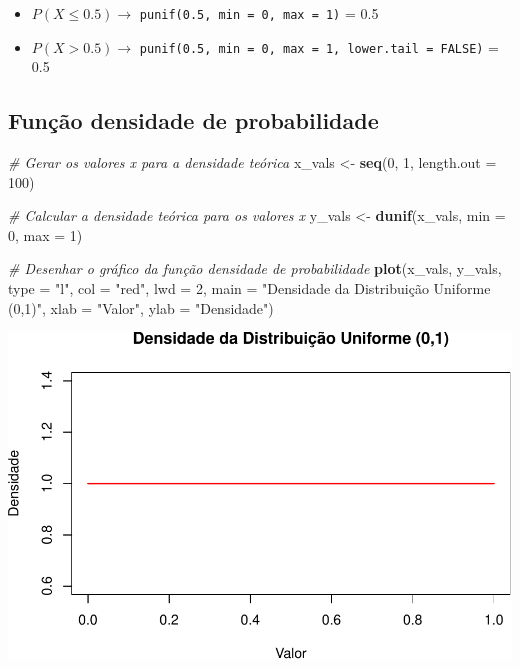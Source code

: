 \documentclass[
]{book}
\newenvironment{Shaded}{\begin{snugshade}}{\end{snugshade}}
\newcommand{\AttributeTok}[1]{\textcolor[rgb]{0.13,0.29,0.53}{#1}}
\newcommand{\CommentTok}[1]{\textcolor[rgb]{0.56,0.35,0.01}{\textit{#1}}}
\newcommand{\DecValTok}[1]{\textcolor[rgb]{0.00,0.00,0.81}{#1}}
\newcommand{\FunctionTok}[1]{\textcolor[rgb]{0.13,0.29,0.53}{\textbf{#1}}}
\newcommand{\NormalTok}[1]{#1}
\newcommand{\OtherTok}[1]{\textcolor[rgb]{0.56,0.35,0.01}{#1}}
\newcommand{\StringTok}[1]{\textcolor[rgb]{0.31,0.60,0.02}{#1}}
\begin{document}
\begin{itemize}
\item
  \(P(X\leq 0.5) \to\) \texttt{punif(0.5,\ min\ =\ 0,\ max\ =\ 1)} = 0.5
\item
  \(P(X > 0.5) \to\) \texttt{punif(0.5,\ min\ =\ 0,\ max\ =\ 1,\ lower.tail\ =\ FALSE)} = 0.5
\end{itemize}

\subsection{Função densidade de probabilidade}\label{funuxe7uxe3o-densidade-de-probabilidade}

\begin{Shaded}
\begin{Highlighting}[]
\CommentTok{\# Gerar os valores x para a densidade teórica}
\NormalTok{x\_vals }\OtherTok{\textless{}{-}} \FunctionTok{seq}\NormalTok{(}\DecValTok{0}\NormalTok{, }\DecValTok{1}\NormalTok{, }\AttributeTok{length.out =} \DecValTok{100}\NormalTok{)}

\CommentTok{\# Calcular a densidade teórica para os valores x}
\NormalTok{y\_vals }\OtherTok{\textless{}{-}} \FunctionTok{dunif}\NormalTok{(x\_vals, }\AttributeTok{min =} \DecValTok{0}\NormalTok{, }\AttributeTok{max =} \DecValTok{1}\NormalTok{)}

\CommentTok{\# Desenhar o gráfico da função densidade de probabilidade}
\FunctionTok{plot}\NormalTok{(x\_vals, y\_vals, }\AttributeTok{type =} \StringTok{"l"}\NormalTok{, }
     \AttributeTok{col =} \StringTok{"red"}\NormalTok{, }\AttributeTok{lwd =} \DecValTok{2}\NormalTok{, }
     \AttributeTok{main =} \StringTok{"Densidade da Distribuição Uniforme (0,1)"}\NormalTok{,}
     \AttributeTok{xlab =} \StringTok{"Valor"}\NormalTok{, }\AttributeTok{ylab =} \StringTok{"Densidade"}\NormalTok{)}
\end{Highlighting}
\end{Shaded}

\includegraphics{meuLivro2_files/figure-latex/unnamed-chunk-133-1.pdf}
\end{document}
